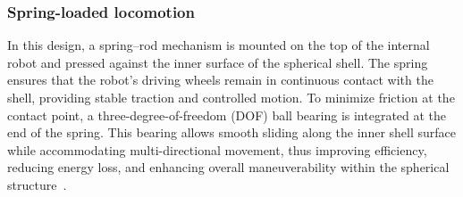 \documentclass[english, bachelor, utf8]{base/thesis_telematics}
\begin{document}
\subsubsection{Spring-loaded locomotion}
In this design, a spring–rod mechanism is mounted on the top of the internal robot and pressed against the inner surface of the spherical shell. 
The spring ensures that the robot’s driving wheels remain in continuous contact with the shell, providing stable traction and controlled motion. 
To minimize friction at the contact point, a three-degree-of-freedom (DOF) ball bearing is integrated at the end of the spring. 
This bearing allows smooth sliding along the inner shell surface while accommodating multi-directional movement, thus improving efficiency, reducing energy loss, and enhancing overall maneuverability within the spherical structure~\cite{old_spring_paper,flywheel_hamaster_explanation,SpheriDrive}.
\end{document}
